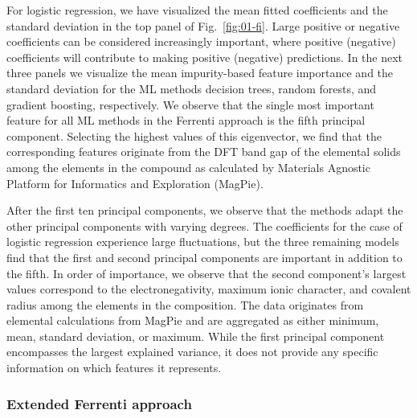 \documentclass[superscriptaddress,unsortedaddress,
 amsmath,amssymb,
 aps,
]{revtex4-2}
\begin{document}
For logistic regression, we have visualized the mean fitted coefficients and the standard deviation in the top panel of Fig.~\ref{fig:01-fi}. Large positive or negative coefficients can be considered increasingly important, where positive (negative) coefficients will contribute to making positive (negative) predictions. In the next three panels we visualize the mean impurity-based feature importance and the standard deviation for the ML methods decision trees, random forests, and gradient boosting, respectively. We observe that the single most important feature for all ML methods in the Ferrenti approach is the fifth principal component. Selecting the highest values of this eigenvector, we find that the corresponding features originate from the DFT band gap of the elemental solids among the elements in the compound as calculated by Materials Agnostic Platform for Informatics and Exploration (MagPie). 

After the first ten principal components, we observe that the methods adapt the other principal components with varying degrees. The coefficients for the case of logistic regression experience large fluctuations, but the three remaining models find that the first and second principal components are important in addition to the fifth. In order of importance, we observe that the second component's largest values correspond to the electronegativity, maximum ionic character, and covalent radius among the elements in the composition. The data originates from elemental calculations from MagPie and are aggregated as either minimum, mean, standard deviation, or maximum. While the first principal component encompasses the largest explained variance, it does not provide any specific information on which features it represents.


\subsubsection*{Extended Ferrenti approach}
\end{document}
